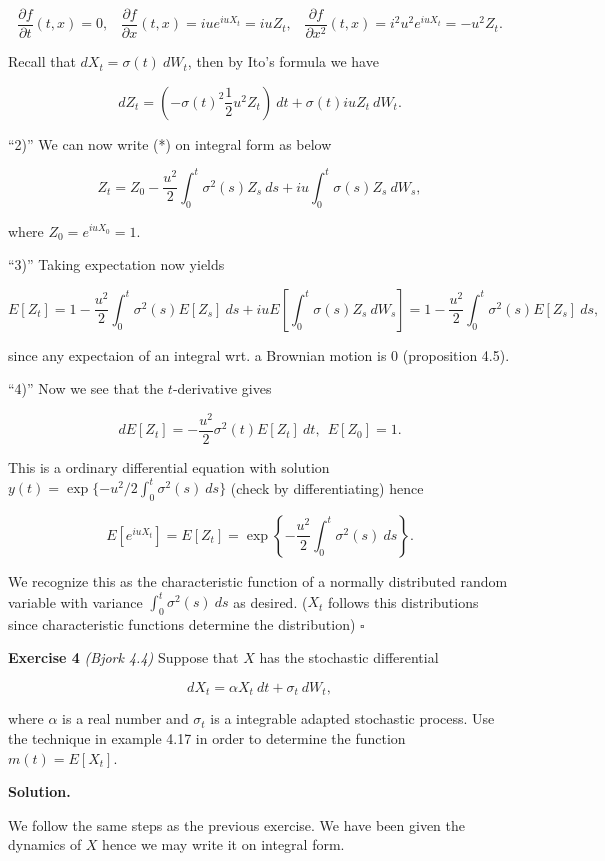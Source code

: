 \documentclass[
]{book}
\begin{document}
\[
\frac{\partial f}{\partial t}(t,x)=0,\hspace{10pt}\frac{\partial f}{\partial x}(t,x) =iue^{iuX_t}=iuZ_t,\hspace{10pt}\frac{\partial f}{\partial x^2}(t,x) =i^2u^2e^{iuX_t}=-u^2Z_t.
\]

Recall that \(dX_t=\sigma(t)\ dW_t\), then by Ito's formula we have

\[
dZ_t=\left(-\sigma(t)^2\frac{1}{2}u^2Z_t\right)\ dt+\sigma(t)iuZ_t\ dW_t.\tag{*}
\]

``2)'' We can now write (*) on integral form as below

\[
Z_t=Z_0-\frac{u^2}{2}\int_0^t\sigma^2(s)Z_s\ ds+iu\int_0^t\sigma (s)Z_s\ dW_s,
\]

where \(Z_0=e^{iuX_0}=1\).

``3)'' Taking expectation now yields

\[
E[Z_t]=1-\frac{u^2}{2}\int_0^t\sigma^2(s)E[Z_s]\ ds+iuE\left[\int_0^t \sigma(s)Z_s\ dW_s\right]=1-\frac{u^2}{2}\int_0^t\sigma^2(s)E[Z_s]\ ds,
\]

since any expectaion of an integral wrt. a Brownian motion is 0 (proposition 4.5).

``4)'' Now we see that the \(t\)-derivative gives

\[
dE[Z_t]=-\frac{u^2}{2}\sigma^2(t)E[Z_t]\ dt,\ \ E[Z_0]=1.
\]

This is a ordinary differential equation with solution \(y(t)=\exp\{-u^2/2\int_0^t\sigma^2(s)\ ds\}\) (check by differentiating) hence

\[
E[e^{iuX_t}]=E[Z_t]=\exp\left\{-\frac{u^2}{2}\int_0^t\sigma^2(s)\ ds\right\}.
\]

We recognize this as the characteristic function of a normally distributed random variable with variance \(\int_0^t\sigma^2(s)\ ds\) as desired. (\(X_t\) follows this distributions since characteristic functions determine the distribution) \(\square\)

\textbf{Exercise 4} \emph{(Bjork 4.4)} Suppose that \(X\) has the stochastic differential

\[
dX_t=\alpha X_t\ dt+\sigma_t\ dW_t,
\]

where \(\alpha\) is a real number and \(\sigma_t\) is a integrable adapted stochastic process. Use the technique in example 4.17 in order to determine the function \(m(t)=E[X_t]\).

\textbf{Solution.}

We follow the same steps as the previous exercise. We have been given the dynamics of \(X\) hence we may write it on integral form.
\end{document}
